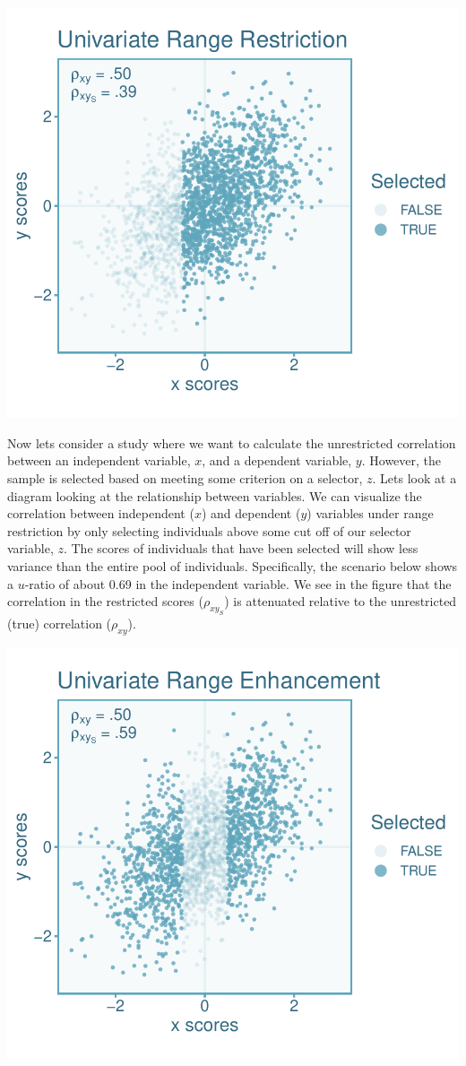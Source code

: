 \documentclass[
  letterpaper,
  DIV=11,
  numbers=noendperiod]{scrreprt}
\begin{document}
\includegraphics{indirect_range_restriction_files/figure-pdf/unnamed-chunk-2-1.pdf}

Now lets consider a study where we want to calculate the unrestricted
correlation between an independent variable, \(x\), and a dependent
variable, \(y\). However, the sample is selected based on meeting some
criterion on a selector, \(z\). Lets look at a diagram looking at the
relationship between variables. We can visualize the correlation between
independent (\(x\)) and dependent (\(y\)) variables under range
restriction by only selecting individuals above some cut off of our
selector variable, \(z\). The scores of individuals that have been
selected will show less variance than the entire pool of individuals.
Specifically, the scenario below shows a \(u\)-ratio of about 0.69 in
the independent variable. We see in the figure that the correlation in
the restricted scores (\(\rho_{xy_S}\)) is attenuated relative to the
unrestricted (true) correlation (\(\rho_{xy}\)).

\includegraphics{indirect_range_restriction_files/figure-pdf/unnamed-chunk-3-1.pdf}
\end{document}
